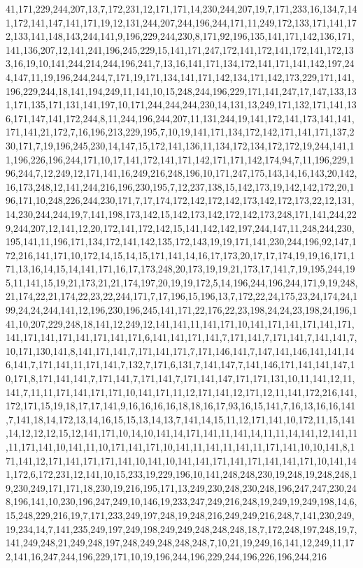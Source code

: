 41,171,229,244,207,13,7,172,231,12,171,171,14,230,244,207,19,7,171,233,16,134,7,141,172,141,147,141,171,19,12,131,244,207,244,196,244,171,11,249,172,133,171,141,172,133,141,148,143,244,141,9,196,229,244,230,8,171,92,196,135,141,171,142,136,171,141,136,207,12,141,241,196,245,229,15,141,171,247,172,141,172,141,172,141,172,133,16,19,10,141,244,214,244,196,241,7,13,16,141,171,134,172,141,171,141,142,197,244,147,11,19,196,244,244,7,171,19,171,134,141,171,142,134,171,142,173,229,171,141,196,229,244,18,141,194,249,11,141,10,15,248,244,196,229,171,141,247,17,147,133,131,171,135,171,131,141,197,10,171,244,244,244,230,14,131,13,249,171,132,171,141,136,171,147,141,172,244,8,11,244,196,244,207,11,131,244,19,141,172,141,173,141,141,171,141,21,172,7,16,196,213,229,195,7,10,19,141,171,134,172,142,171,141,171,137,230,171,7,19,196,245,230,14,147,15,172,141,136,11,134,172,134,172,172,19,244,141,11,196,226,196,244,171,10,17,141,172,141,171,142,171,171,142,174,94,7,11,196,229,196,244,7,12,249,12,171,141,16,249,216,248,196,10,171,247,175,143,14,16,143,20,142,16,173,248,12,141,244,216,196,230,195,7,12,237,138,15,142,173,19,142,142,172,20,196,171,10,248,226,244,230,171,7,17,174,172,142,172,142,173,142,172,173,22,12,131,14,230,244,244,19,7,141,198,173,142,15,142,173,142,172,142,173,248,171,141,244,229,244,207,12,141,12,20,172,141,172,142,15,141,142,142,197,244,147,11,248,244,230,195,141,11,196,171,134,172,141,142,135,172,143,19,19,171,141,230,244,196,92,147,172,216,141,171,10,172,14,15,14,15,171,141,14,16,17,173,20,17,17,174,19,19,16,171,171,13,16,14,15,14,141,171,16,17,173,248,20,173,19,19,21,173,17,141,7,19,195,244,195,11,141,15,19,21,173,21,21,174,197,20,19,19,172,5,14,196,244,196,244,171,9,19,248,21,174,22,21,174,22,23,22,244,171,7,17,196,15,196,13,7,172,22,24,175,23,24,174,24,199,24,24,244,141,12,196,230,196,245,141,171,22,176,22,23,198,24,24,23,198,24,196,141,10,207,229,248,18,141,12,249,12,141,141,11,141,171,10,141,171,141,171,141,171,141,171,141,171,141,171,141,171,6,141,141,171,141,7,171,141,7,171,141,7,141,141,7,10,171,130,141,8,141,171,141,7,171,141,171,7,171,146,141,7,147,141,146,141,141,146,141,7,171,141,11,171,141,7,132,7,171,6,131,7,141,147,7,141,146,171,141,141,147,10,171,8,171,141,141,7,171,141,7,171,141,7,171,141,147,171,171,131,10,11,141,12,11,141,7,11,11,171,141,171,171,10,141,171,11,12,171,141,12,171,12,11,141,172,216,141,172,171,15,19,18,17,17,141,9,16,16,16,16,18,18,16,17,93,16,15,141,7,16,13,16,16,141,7,141,18,14,172,13,14,16,15,15,13,14,13,7,141,14,15,11,12,171,141,10,172,11,15,141,14,12,12,12,15,12,141,171,10,14,10,141,14,171,141,11,141,14,11,11,14,141,12,141,11,11,171,141,10,141,11,10,171,141,171,10,141,11,141,11,141,11,171,141,10,10,141,8,171,141,12,171,141,171,171,141,10,141,10,141,141,171,141,171,141,141,171,10,141,141,172,6,172,231,12,141,10,15,233,19,229,196,10,141,248,248,230,19,248,19,248,248,19,230,249,171,171,18,230,19,216,195,171,13,249,230,248,230,248,196,247,247,230,248,196,141,10,230,196,247,249,10,146,19,233,247,249,216,248,19,249,19,249,198,14,6,15,248,229,216,19,7,171,233,249,197,248,19,248,216,249,249,216,248,7,141,230,249,19,234,14,7,141,235,249,197,249,198,249,249,248,248,248,18,7,172,248,197,248,19,7,141,249,248,21,249,248,197,248,249,248,248,248,7,10,21,19,249,16,141,12,249,11,172,141,16,247,244,196,229,171,10,19,196,244,196,229,244,196,226,196,244,216